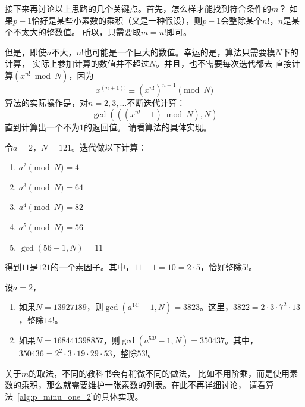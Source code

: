 接下来再讨论以上思路的几个关键点。首先，怎么样才能找到符合条件的$m$？
如果$p - 1$恰好是某些小素数的乘积（又是一种假设），则$p-1$会整除某个$n!$，$n$是某个不太大的整数值。 
所以，只需要取$m = n!$即可。

但是，即使$n$不大，$n!$也可能是一个巨大的数值。幸运的是，算法只需要模$N$下的计算，
实际上参加计算的数值并不超过$N$。并且，也不需要每次迭代都去
直接计算$(x^{n!} \bmod N)$，因为
\[x^{(n+1)!} \equiv (x^{n!})^{n+1} \pmod{N}\]
算法的实际操作是，对$n = 2, 3, \ldots $不断迭代计算： 
\[ \gcd(((x^{n!} - 1)\bmod N), N)\]
直到计算出一个不为$1$的返回值。
请看算法的具体实现。
%
%
%
\begin{center}
	
\end{center}

\begin{example}
令$a=2$，$N=121$。迭代做以下计算：
\begin{enumerate}
\item $a^2 \pmod{N} = 4$
\item $a^3 \pmod{N} = 64$
\item $a^4 \pmod{N} = 82$
\item $a^5 \pmod{N} = 56$
\item $\gcd(56-1, N) = 11$
\end{enumerate} 
得到$11$是$121$的一个素因子。其中，$11-1 = 10 = 2 \cdot 5$，恰好整除$5!$。
\end{example}

\begin{example}
设$a=2$，
\begin{enumerate}
\item 如果$N = 13927189$，则$\gcd(a^{14!} -1, N) = 3823$。这里，$3822 = 2 \cdot 3 \cdot 7^2 \cdot 13$，整除$14!$。

\item 如果$N = 168441398857$，则$\gcd(a^{53!} -1, N) = 350437$。其中，$350436 = 2^2 \cdot 3 \cdot 19 \cdot 29 \cdot 53$，整除$53!$。
\end{enumerate} 
\end{example}

关于$m$的取法，不同的教科书会有稍微不同的做法，
比如不用阶乘，而是使用素数的乘积，那么就需要维护一张素数的列表。在此不再详细讨论，
请看算法~\ref{alg:p_minu_one_2}的具体实现。
\begin{center}

\end{center}

